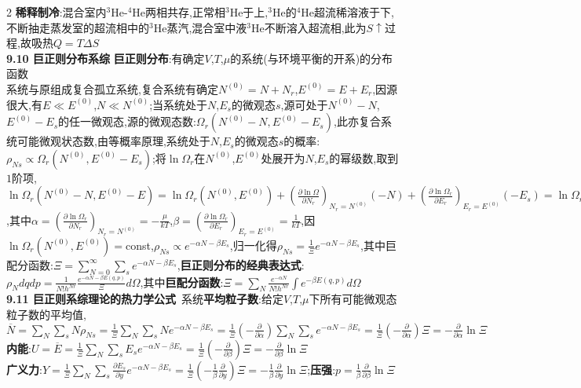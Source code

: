 \documentclass[10pt,a4paper]{article}
\begin{document}
\begin{multicols}{2}
\textbf{稀释制冷}:混合室内$^3$He-$^4$He两相共存,正常相$^3$He于上,$^3$He的$^4$He超流稀溶液于下,不断抽走蒸发室的超流相中的$^3$He蒸汽,混合室中液$^3$He不断溶入超流相,此为$S\uparrow$过程,故吸热$Q=T\Delta S$\\
\textbf{9.10 巨正则分布系综}
\textbf{巨正则分布}:有确定$V$,$T$,$\mu$的系统(与环境平衡的开系)的分布函数\\
系统与原组成复合孤立系统,复合系统有确定$N^{(0)}=N+N_r$,$E^{(0)}=E+E_r$,因源很大,有$E\ll E^{(0)}$,$N\ll N^{(0)}$;当系统处于$N$,$E_s$的微观态$s$,源可处于$N^{(0)}-N$,$E^{(0)}-E_s$的任一微观态,源的微观态数:$\Omega_r(N^{(0)}-N,E^{(0)}-E_s)$,此亦复合系统可能微观状态数,由等概率原理,系统处于$N$,$E_s$的微观态$s$的概率:$\rho_{Ns}\propto\Omega_r(N^{(0)},E^{(0)}-E_s)$;将$\ln\Omega_r$在$N^{(0)}$,$E^{(0)}$处展开为$N$,$E_s$的幂级数,取到$1$阶项,$\ln\Omega_r(N^{(0)}-N,E^{(0)}-E)=\ln\Omega_r(N^{(0)},E^{(0)})+\left(\frac{\partial\ln\Omega}{\partial N_r}\right)_{N_r=N^{(0)}}(-N)+\left(\frac{\partial\ln\Omega_r}{\partial E_r}\right)_{E_r=E^{(0)}}(-E_s)=\ln\Omega_r(N^{(0)},E^{(0)})-\alpha N-\beta E_s$,其中$\alpha=\left(\frac{\partial\ln\Omega_r}{\partial N_r}\right)_{N_r=N^{(0)}}=-\frac{\mu}{kT}$,$\beta=\left(\frac{\partial\ln\Omega_r}{\partial E_r}\right)_{E_r=E^{(0)}}=\frac{1}{kT}$,因$\ln\Omega_r(N^{(0)},E^{(0)})=$const,$\rho_{Ns}\propto e^{-\alpha N-\beta E_s}$,归一化得$\rho_{Ns}=\frac{1}{\Xi}e^{-\alpha N-\beta E_s}$,其中巨配分函数:$\Xi=\sum_{N=0}^{\infty}\sum_se^{-\alpha N-\beta E_s}$,\textbf{巨正则分布的经典表达式}:$\rho_Ndqdp=\frac{1}{N!h^{Nr}}\frac{e^{-\alpha N-\beta E(q,p)}}{\Xi}d\Omega$,其中\textbf{巨配分函数}:$\Xi=\sum_N\frac{e^{-\alpha N}}{N!h^{Nr}}\int e^{-\beta E(q,p)}d\Omega$\\
\textbf{9.11 巨正则系综理论的热力学公式}~系统\textbf{平均粒子数}:给定$V$,$T$,$\mu$下所有可能微观态粒子数的平均值,$\overline{N}=\sum_N\sum_sN\rho_{Ns}=\frac{1}{\Xi}\sum_N\sum_sNe^{-\alpha N-\beta E_s}=\frac{1}{\Xi}\left(-\frac{\partial}{\partial\alpha}\right)\sum_N\sum_se^{-\alpha N-\beta E_s}=\frac{1}{\Xi}\left(-\frac{\partial}{\partial\alpha}\right)\Xi=-\frac{\partial}{\partial\alpha}\ln\Xi$\\
\textbf{内能}:$U=\overline{E}=\frac{1}{\Xi}\sum_N\sum_sE_se^{-\alpha N-\beta E_s}=\frac{1}{\Xi}\left(-\frac{\partial}{\partial\beta}\right)\Xi=-\frac{\partial}{\partial\beta}\ln\Xi$\\
\textbf{广义力}:$Y=\frac{1}{\Xi}\sum_N\sum_s\frac{\partial E_s}{\partial y}e^{-\alpha N-\beta E_s}=\frac{1}{\Xi}\left(-\frac{1}{\beta}\frac{\partial}{\partial y}\right)\Xi=-\frac{1}{\beta}\frac{\partial}{\partial y}\ln\Xi$;\textbf{压强}:$p=\frac{1}{\beta}\frac{\partial}{\partial\beta}\ln\Xi$\\

\end{multicols}
\end{document}
